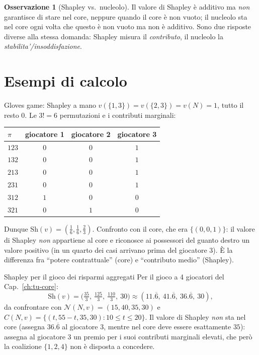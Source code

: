 \documentclass[12pt,a4paper,twoside]{book}
\theoremstyle{plain}
\theoremstyle{definition}
\newtheorem{remark}[theorem]{Osservazione}
\newcommand{\Sh}{\mathrm{Sh}}
\begin{document}
\begin{remark}[Shapley vs.\ nucleolo]
Il valore di Shapley è additivo ma \emph{non} garantisce di stare nel core,
neppure quando il core è non vuoto; il nucleolo sta nel core ogni volta che
questo è non vuoto ma non è additivo. Sono due risposte diverse alla stessa
domanda: Shapley misura il \emph{contributo}, il nucleolo la
\emph{stabilita'/insoddisfazione}.
\end{remark}

\section{Esempi di calcolo}

\begin{exbox}{Gloves game: Shapley a mano}
$v(\{1,3\})=v(\{2,3\})=v(N)=1$, tutto il resto $0$. Le $3!=6$ permutazioni e i
contributi marginali:
\begin{center}
\begin{tabular}{lccc}
\toprule
$\pi$ & giocatore 1 & giocatore 2 & giocatore 3\\
\midrule
$123$ & $0$ & $0$ & $1$\\
$132$ & $0$ & $0$ & $1$\\
$213$ & $0$ & $0$ & $1$\\
$231$ & $0$ & $0$ & $1$\\
$312$ & $1$ & $0$ & $0$\\
$321$ & $0$ & $1$ & $0$\\
\bottomrule
\end{tabular}
\end{center}
Dunque $\Sh(v)=(\tfrac16,\tfrac16,\tfrac23)$. Confronto con il core, che era
$\{(0,0,1)\}$: il valore di Shapley \emph{non} appartiene al core e riconosce ai
possessori del guanto destro un valore positivo (in un quarto dei casi arrivano
prima del giocatore 3). È la differenza fra ``potere contrattuale'' (core) e
``contributo medio'' (Shapley).
\end{exbox}

\begin{exbox}{Shapley per il gioco dei risparmi aggregati}
Per il gioco a 4 giocatori del Cap.~\ref{ch:tu-core}:
\[
  \Sh(v)=\bigl(\tfrac{35}{3},\ \tfrac{125}{3},\ \tfrac{110}{3},\ 30\bigr)
  \approx(11.\overline{6},\ 41.\overline{6},\ 36.\overline{6},\ 30),
\]
da confrontare con
$\mathcal{N}(N,v)=(15,40,35,30)$ e $C(N,v)=\{(t,55-t,35,30):10\le t\le 20\}$.
Il valore di Shapley \emph{non} sta nel core (assegna $36.\overline{6}$ al
giocatore 3, mentre nel core deve essere esattamente $35$): assegna al giocatore 3
un premio per i suoi contributi marginali elevati, che però la coalizione
$\{1,2,4\}$ non è disposta a concedere.
\end{exbox}
\end{document}
